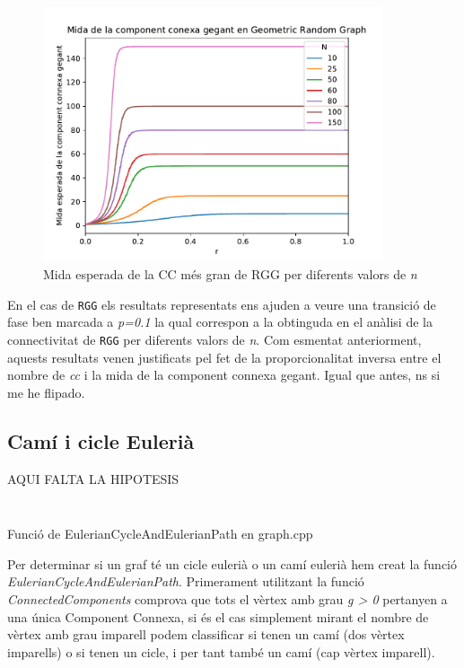 \begin{figure}[H]
    \centering
    \includegraphics[width=10cm]{plots/GRG_midaCompConMax.pdf}
    \caption{Mida esperada de la CC més gran de RGG per diferents valors de \textit{n}}
    \label{fig:connect_04}
\end{figure}

En el cas de \texttt{RGG} els resultats representats ens ajuden a veure una transició de fase ben marcada a \textit{p=0.1} la qual correspon a la obtinguda en el anàlisi de la connectivitat de \texttt{RGG} per diferents valors de \textit{n}. Com esmentat anteriorment, aquests resultats venen justificats pel fet de la proporcionalitat inversa entre el nombre de \textit{cc} i la mida de la component connexa gegant. Igual que antes, ns si me he flipado.

\subsection{Camí i cicle Eulerià}
AQUI FALTA LA HIPOTESIS

\begin{listing}
\inputminted[firstline=8,lastline=8]{cpp}{src/graph.h}
\inputminted[firstline=60,lastline=81]{cpp}{src/graph.cpp}
\caption{Funció de EulerianCycleAndEulerianPath en graph.cpp}
\end{listing}

Per determinar si un graf té un cicle eulerià o un camí eulerià hem creat la funció \textit{EulerianCycleAndEulerianPath}. Primerament utilitzant la funció \textit{ConnectedComponents} comprova que tots el vèrtex amb grau \textit{g > 0} pertanyen a una única Component Connexa, si és el cas simplement mirant el nombre de vèrtex amb grau imparell podem classificar si tenen un camí (dos vèrtex imparells) o si tenen un cicle, i per tant també un camí (cap vèrtex imparell).

